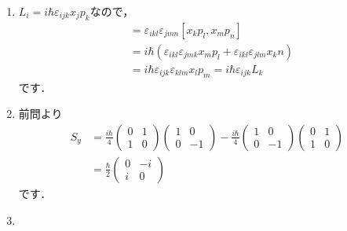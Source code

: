 \documentclass[a4paper,pdflatex,ja=standard]{bxjsarticle}
\begin{document}
\begin{enumerate}

  \item 

  $L_i=i\hbar\varepsilon_{ijk}x_jp_k$なので，
  \begin{align}
    [L_i,L_j]
    &=
    \varepsilon_{ikl}\varepsilon_{jmn}
    [x_kp_l,x_mp_n]
    \nonumber
    \\
    &=
    i\hbar
    (
      \varepsilon_{ikl}\varepsilon_{jmk}x_mp_l
      +
      \varepsilon_{ikl}\varepsilon_{jlm}x_kn
    )
    \nonumber
    \\
    &=
    i\hbar\varepsilon_{ijk}\varepsilon_{klm}x_lp_m
    =
    i\hbar \varepsilon_{ijk}L_k
  \end{align}
  です．


  \item 

  前問より
  \begin{align}
    S_y
    &=
    \frac{i\hbar}{4}
    \begin{pmatrix}
      0 & 1 \\
      1 & 0
    \end{pmatrix}
    \begin{pmatrix}
      1 & 0 \\
      0 & -1
    \end{pmatrix}
    -
    \frac{i\hbar}{4}
    \begin{pmatrix}
      1 & 0 \\
      0 & -1
    \end{pmatrix}
    \begin{pmatrix}
      0 & 1 \\
      1 & 0
    \end{pmatrix}
    \nonumber
    \\
    &=
    \frac{\hbar}{2}
    \begin{pmatrix}
      0 & -i \\
      i & 0
    \end{pmatrix}
  \end{align}
  です．


  \item 


\end{enumerate}
\end{document}
